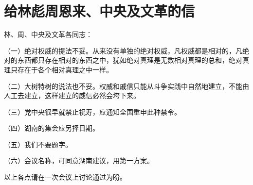 \section[给林彪周恩来、中央及文革的信（一九六七年十二月十七日）]{给林彪周恩来、中央及文革的信}


\noindent 林、周、中央及文革各同志：

（一）绝对权威的提法不妥。从来没有单独的绝对权威，凡权威都是相对的，凡绝对的东西都只存在相对的东西之中，犹如绝对真理是无数相对真理的总和，绝对真理只存在于各个相对真理之中一样。

（二）大树特树的说法也不妥。权威和戚信只能从斗争实践中自然地建立，不能由人工去建立，这样建立的威信必然会垮下来。

（三）党中央很早就禁止祝寿，应通知全国重申此种禁令。

（四）湖南的集会应另择日期。

（五）我们不要题字。

（六）会议名称，可同意湖南建议，用第一方案。

以上各点请在一次会议上讨论通过为盼。



